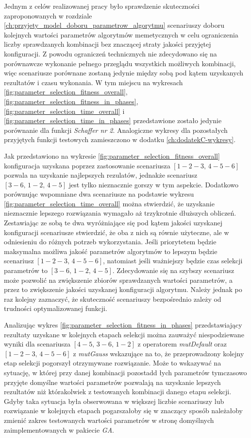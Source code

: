 Jednym z celów realizowanej pracy było sprawdzenie skuteczności zaproponowanych w rozdziale \ref{ch:przyjety_model_doboru_parametrow_algorytmu} scenariuszy doboru kolejnych wartości parametrów algorytmów memetycznych w celu ograniczenia liczby sprawdzanych kombinacji bez znaczącej straty jakości przyjętej konfiguracji. Z powodu ograniczeń technicznych nie zdecydowano się na porównawcze wykonanie pełnego przeglądu wszystkich możliwych kombinacji, więc scenariusze porównane zostaną jedynie między sobą pod kątem uzyskanych rezultatów i czasu wykonania. W tym miejscu na wykresach \ref{fig:parameter_selection_fitness_overall}, \ref{fig:parameter_selection_fitness_in_phases}, \ref{fig:parameter_selection_time_overall} i \ref{fig:parameter_selection_time_in_phases} przedstawione zostało jedynie porównanie dla funkcji \emph{Schaffer nr 2}. Analogiczne wykresy dla pozostałych przyjętych funkcji testowych zamieszczono w dodatku \ref{ch:dodatekC-wykresy}.
\par
Jak przedstawiono na wykresie \ref{fig:parameter_selection_fitness_overall} konfiguracja uzyskana poprzez zastosowanie scenariusza $[1-2-3,\,4-5-6]$ pozwala na uzyskanie najlepszych rezulatów, jednakże scenariusz $[3-6,\,1-2,\,4-5]$ jest tylko nieznacznie gorszy w tym aspekcie. Dodatkowo porównując wspomniane dwa scenariusze na podstawie wykresu \ref{fig:parameter_selection_time_overall} można stwierdzić, że uzyskanie nieznacznie lepszego rozwiązania wymagało aż trzykrotnie dłuższych obliczeń. Zestawiając ze sobą te dwa wyróżniające się pod kątem jakości uzyskanej konfiguracji scenariusze stwierdzić, że oba z nich są równie użyteczne, ale w odniesieniu do różnych potrzeb wykorzystania. Jeśli priorytetem będzie maksymalna możliwa jakość parametrów algorytmów to lepszym będzie scenariusz $[1-2-3,\,4-5-6]$, natomiast jeśli ważniejszy będzie czas selekcji parametrów to $[3-6,\,1-2,\,4-5]$. Zdecydowanie się na szybszy scenariusz może pozwolić na zwiększenie zbiorów sprawdzanych wartości parametrów, a przez to zwiększenie jakości uzyskanej konfiguracji algorytmu. Należy jednak po raz kolejny zaznaczyć, że skuteczność scenariuszy bezpośrednio zależy od trudności optymalizowanej funkcji.
\par
Analizując wykres \ref{fig:parameter_selection_fitness_in_phases} przedstawiający rezultaty uzyskane w kolejnych etapach selekcji można zauważyć niespodziewane wyniki dla scenariusza $[4-5,\,3-6,\,1-2]$ z operatorem \emph{mutDefault} oraz $[1-2-3,\,4-5-6]$ z \emph{mutGauss} wskazujące na to, że przeprowadzony kolejny etap selekcji pogorszył otrzymywane rozwiązanie. Może to wskazywać na sytuację, w której przy danej kombinacji pozostadd łych parametrów tymczasowo przyjęte domyślne wartości parametrów pozwalają na uzyskanie lepszych rezultatów niż którakolwiek z testowanych kombinacji danego etapu selekcji. Gdyby taka sytuacja była obserwowana w większej liczbie scenariuszy lub rozwiązanie w kolejnych etapach pogarszałoby się w znaczący sposób należałoby zmienić zakres testowanych wartości parametrów w stronę domyślnych zaimplementowanych w pakiecie \emph{GA}.
